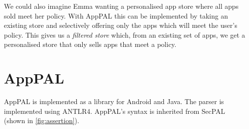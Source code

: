 \documentclass[]{llncs}
\begin{document}
We could also imagine Emma wanting a personalised app store where all apps sold meet her policy.
With AppPAL this can be implemented by taking an existing store and selectively offering only the apps which will meet the user's policy.
This gives us a \emph{filtered store} which, from an existing set of apps, we get a personalised store that only sells apps that meet a policy.

\section{AppPAL}
\label{sec:details}
\label{ssec:language}

AppPAL is implemented as a library for Android and Java.
The parser is implemented using ANTLR4.
AppPAL's syntax is inherited from SecPAL~\cite{Becker:2006vh} (shown in \autoref{fig:assertion}).
\end{document}
